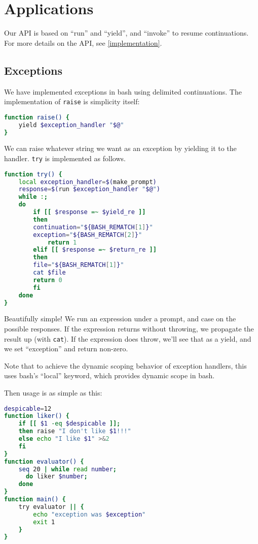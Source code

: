 \documentclass[sigplan]{acmart}
\begin{document}
\section{Applications}\label{applications}

Our API is based on ``run'' and ``yield'', and ``invoke'' to resume continuations.
For more details on the API, see \ref{implementation}.

\subsection{Exceptions}
We have implemented exceptions in bash using delimited continuations.
The implementation of \texttt{raise} is simplicity itself:

\begin{lstlisting}[language=bash]
function raise() {
    yield $exception_handler "$@"
}
\end{lstlisting}

We can raise whatever string we want as an exception by yielding it to the handler.
\texttt{try} is implemented as follows.

\begin{lstlisting}[language=bash]
function try() {
    local exception_handler=$(make_prompt)
    response=$(run $exception_handler "$@")
    while :;
    do
        if [[ $response =~ $yield_re ]]
        then
  	    continuation="${BASH_REMATCH[1]}"
  	    exception="${BASH_REMATCH[2]}"
            return 1
        elif [[ $response =~ $return_re ]]
        then
  	    file="${BASH_REMATCH[1]}"
  	    cat $file
  	    return 0
        fi
    done
}
\end{lstlisting}

Beautifully simple!
We run an expression under a prompt, and case on the possible responses.
If the expression returns without throwing, we propagate the result up (with \texttt{cat}).
If the expression does throw, we'll see that as a yield,
and we set ``exception'' and return non-zero.

Note that to achieve the dynamic scoping behavior of exception handlers,
this uses bash's ``local'' keyword,
which provides dynamic scope in bash.

Then usage is as simple as this:

\begin{lstlisting}[language=bash]
despicable=12
function liker() {
    if [[ $1 -eq $despicable ]];
    then raise "I don't like $1!!!"
    else echo "I like $1" >&2
    fi
}
function evaluator() {
    seq 20 | while read number;
      do liker $number;
    done
}
function main() {
    try evaluator || {
        echo "exception was $exception"
        exit 1
    }
}
\end{lstlisting}
\end{document}
